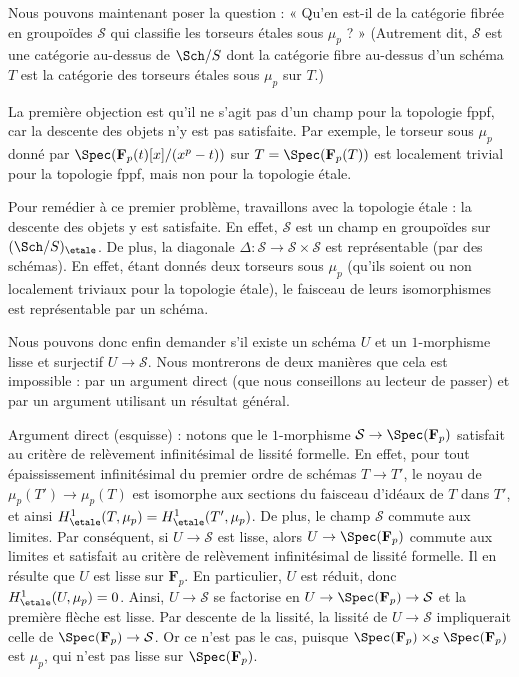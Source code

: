 \medskip\noindent
Nous pouvons maintenant poser la question : « Qu'en est-il de la catégorie fibrée en groupoïdes
$\mathcal{S}$ qui classifie les torseurs étales sous $\mu_p$ ? » (Autrement dit,
$\mathcal{S}$ est une catégorie au-dessus de $\Sch/S$ dont la catégorie fibre au-dessus d'un
schéma $T$ est la catégorie des torseurs étales sous $\mu_p$ sur $T$.)

\medskip\noindent
La première objection est qu'il ne s'agit pas d'un champ pour la topologie fppf,
car la descente des objets n'y est pas satisfaite. Par exemple, le
torseur sous $\mu_p$ donné par $\Spec(\mathbf{F}_p(t)[x]/(x^p - t))$ sur
$T = \Spec(\mathbf{F}_p(T))$ est localement trivial pour la topologie fppf, mais
non pour la topologie étale.

\medskip\noindent
Pour remédier à ce premier problème, travaillons avec la topologie étale :
la descente des objets y est satisfaite. En effet,
$\mathcal{S}$ est un champ en groupoïdes sur $(\Sch/S)_\etale$.
De plus, la diagonale
$\Delta : \mathcal{S} \to \mathcal{S} \times \mathcal{S}$
est représentable (par des schémas). En effet, étant donnés deux
torseurs sous $\mu_p$ (qu'ils soient ou non localement triviaux pour la topologie étale),
le faisceau de leurs isomorphismes est représentable par un schéma.

\medskip\noindent
Nous pouvons donc enfin demander s'il existe un schéma $U$ et un
$1$-morphisme lisse et surjectif $U \to \mathcal{S}$. Nous montrerons de deux
manières que cela est impossible : par un argument direct (que nous conseillons
au lecteur de passer) et par un argument utilisant un résultat général.

\medskip\noindent
Argument direct (esquisse) : notons que le $1$-morphisme
$\mathcal{S} \to \Spec(\mathbf{F}_p)$ satisfait au
critère de relèvement infinitésimal de lissité formelle.
En effet, pour tout épaississement infinitésimal du premier ordre
de schémas $T \to T'$, le noyau de $\mu_p(T') \to \mu_p(T)$
est isomorphe aux sections du faisceau d'idéaux de $T$ dans $T'$, et
ainsi $H^1_\etale(T, \mu_p) = H^1_\etale(T', \mu_p)$.
De plus, le champ $\mathcal{S}$ commute aux limites. Par conséquent,
si $U \to \mathcal{S}$ est lisse, alors $U \to \Spec(\mathbf{F}_p)$
commute aux limites et satisfait au
critère de relèvement infinitésimal de lissité formelle.
Il en résulte que $U$ est lisse sur $\mathbf{F}_p$.
En particulier, $U$ est réduit, donc $H^1_\etale(U, \mu_p) = 0$.
Ainsi, $U \to \mathcal{S}$ se factorise en
$U \to \Spec(\mathbf{F}_p) \to \mathcal{S}$
et la première flèche est lisse. Par descente de la lissité,
la lissité de $U \to \mathcal{S}$ impliquerait celle de
$\Spec(\mathbf{F}_p) \to \mathcal{S}$. Or ce n'est
pas le cas, puisque
$\Spec(\mathbf{F}_p) \times_\mathcal{S} \Spec(\mathbf{F}_p)$
est $\mu_p$, qui n'est pas lisse sur $\Spec(\mathbf{F}_p)$.


